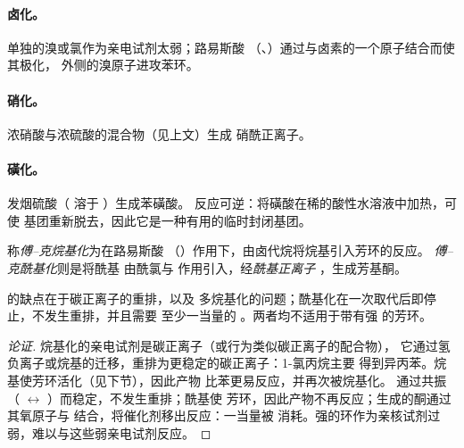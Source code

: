 \paragraph{卤化。} 单独的溴或氯作为亲电试剂太弱；路易斯酸
（、）通过与卤素的一个原子结合而使其极化，
外侧的溴原子进攻苯环。

\paragraph{硝化。} 浓硝酸与浓硫酸的混合物（见上文）生成
硝酰正离子。

\paragraph{磺化。} 发烟硫酸（ 溶于 ）生成苯磺酸。
反应可逆：将磺酸在稀的酸性水溶液中加热，可使
 基团重新脱去，因此它是一种有用的临时封闭基团。

\begin{definition}[傅–克反应]\label{def:b2:aromatic-substitution:friedel-crafts}
称\emph{傅–克烷基化}为在路易斯酸
（）作用下，由卤代烷将烷基引入芳环的反应。
\emph{傅–克酰基化}则是将酰基
 由酰氯与  作用引入，经\emph{酰基正离子}
，生成芳基酮。
\end{definition}

\begin{proposition}[傅–克反应的局限性]\label{prop:b2:aromatic-substitution:friedel-crafts-limits}
的缺点在于碳正离子的重排，以及
多烷基化的问题；酰基化在一次取代后即停止，不发生重排，并且需要
至少一当量的 。两者均不适用于带有强
的芳环。
\end{proposition}

\begin{proof}[论证]
烷基化的亲电试剂是碳正离子（或行为类似碳正离子的配合物），
它通过氢负离子或烷基的迁移，重排为更稳定的碳正离子：1-氯丙烷主要
得到异丙苯。烷基使芳环活化（见下节），因此产物
比苯更易反应，并再次被烷基化。
通过共振（ $\leftrightarrow$ ）而稳定，不发生重排；酰基使
芳环，因此产物不再反应；生成的酮通过其氧原子与
 结合，将催化剂移出反应：一当量被
消耗。强的环作为亲核试剂过弱，难以与这些弱亲电试剂反应。
\end{proof}


